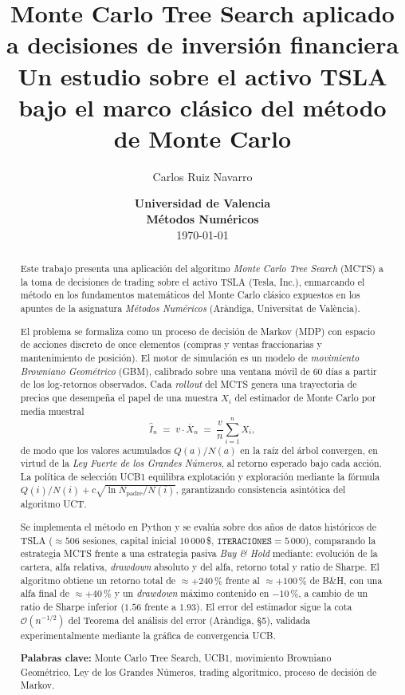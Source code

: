 \documentclass[12pt, a4paper]{article}
\title{
    \vspace{-1.5cm}
    \textbf{Monte Carlo Tree Search aplicado a decisiones de inversión financiera}\\[0.3cm]
    \large Un estudio sobre el activo TSLA bajo el marco clásico del método de Monte Carlo
}
\author{Carlos Ruiz Navarro}
\date{\textbf{\small{Universidad de Valencia \\ Métodos Numéricos}} \\[0.2cm] \today}
\theoremstyle{definition}
\theoremstyle{remark}
\begin{document}
\maketitle

\begin{abstract}
\noindent
Este trabajo presenta una aplicación del algoritmo \emph{Monte Carlo Tree Search} (MCTS) a la toma de decisiones de trading sobre el activo TSLA (Tesla, Inc.), enmarcando el método en los fundamentos matemáticos del Monte Carlo clásico expuestos en los apuntes de la asignatura \emph{Métodos Numéricos} (Aràndiga, Universitat de València).

El problema se formaliza como un proceso de decisión de Markov (MDP) con espacio de acciones discreto de once elementos (compras y ventas fraccionarias y mantenimiento de posición). El motor de simulación es un modelo de \emph{movimiento Browniano Geométrico} (GBM), calibrado sobre una ventana móvil de $60$ días a partir de los log-retornos observados. Cada \emph{rollout} del MCTS genera una trayectoria de precios que desempeña el papel de una muestra $X_i$ del estimador de Monte Carlo por media muestral
\[
    \widehat{I}_n \;=\; v \cdot \overline{X}_n \;=\; \frac{v}{n}\sum_{i=1}^{n} X_i,
\]
de modo que los valores acumulados $Q(a)/N(a)$ en la raíz del árbol convergen, en virtud de la \emph{Ley Fuerte de los Grandes Números}, al retorno esperado bajo cada acción. La política de selección UCB1 equilibra explotación y exploración mediante la fórmula $Q(i)/N(i) + c\sqrt{\ln N_{\text{padre}}/N(i)}$, garantizando consistencia asintótica del algoritmo UCT.

Se implementa el método en Python y se evalúa sobre dos años de datos históricos de TSLA ($\approx 506$ sesiones, capital inicial $10\,000$\,\$, $\texttt{ITERACIONES}=5\,000$), comparando la estrategia MCTS frente a una estrategia pasiva \emph{Buy \& Hold} mediante: evolución de la cartera, alfa relativa, \emph{drawdown} absoluto y del alfa, retorno total y ratio de Sharpe. El algoritmo obtiene un retorno total de $\approx +240\,\%$ frente al $\approx +100\,\%$ de B\&H, con una alfa final de $\approx +40\,\%$ y un \emph{drawdown} máximo contenido en $-10\,\%$, a cambio de un ratio de Sharpe inferior ($1{.}56$ frente a $1{.}93$). El error del estimador sigue la cota $\mathcal{O}(n^{-1/2})$ del Teorema del análisis del error (Aràndiga, §5), validada experimentalmente mediante la gráfica de convergencia UCB.

\vspace{0.3cm}
\noindent\textbf{Palabras clave:} Monte Carlo Tree Search, UCB1, movimiento Browniano Geométrico, Ley de los Grandes Números, trading algorítmico, proceso de decisión de Markov.
\end{abstract}
\end{document}
